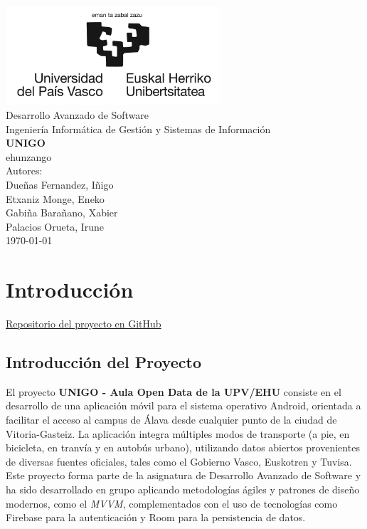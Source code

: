 \documentclass[a4paper,12pt]{report}
\begin{document}
  \begin{titlepage}
    \centering
    \includegraphics[width=0.6\textwidth]{img/logo.jpg}\\
    \vspace{1cm}
    \LARGE Desarrollo Avanzado de Software\\
    \vspace{0.5cm}
    \Large Ingeniería Informática de Gestión y Sistemas de Información\\
    \vspace{3cm}
    \vspace{0.5cm}
    \Huge \textbf{UNIGO}\\
    \huge ehunzango\\
    \vspace{2.5cm}
    \Large Autores:\\
    \vspace{0.2cm}
    \large Dueñas Fernandez, Iñigo\\
    \large Etxaniz Monge, Eneko\\
    \large Gabiña Barañano, Xabier\\
    \large Palacios Orueta, Irune\\
    \vfill
    \today
  \end{titlepage}
  \tableofcontents
  \listoffigures
  \chapter{Introducción}
    \begin{center}
      \href{https://github.com/Xabierland/UNIGO}{Repositorio del proyecto en GitHub}
    \end{center}
    \section{Introducción del Proyecto}
      El proyecto \textbf{UNIGO - Aula Open Data de la UPV/EHU} consiste en el desarrollo de una aplicación móvil para el sistema operativo Android, orientada a facilitar el acceso al campus de Álava desde cualquier punto de la ciudad de Vitoria-Gasteiz. La aplicación integra múltiples modos de transporte (a pie, en bicicleta, en tranvía y en autobús urbano), utilizando datos abiertos provenientes de diversas fuentes oficiales, tales como el Gobierno Vasco, Euskotren y Tuvisa. Este proyecto forma parte de la asignatura de Desarrollo Avanzado de Software y ha sido desarrollado en grupo aplicando metodologías ágiles y patrones de diseño modernos, como el \textit{MVVM}, complementados con el uso de tecnologías como Firebase para la autenticación y Room para la persistencia de datos.
\end{document}
